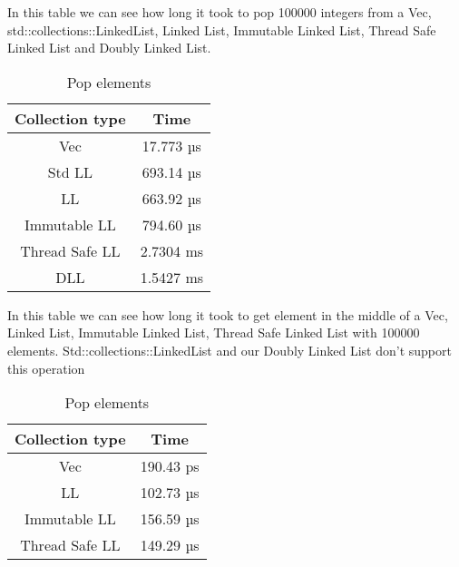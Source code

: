 \documentclass[11pt,twoside,a4paper]{article}
\begin{document}
In this table we can see how long it took to pop 100000 integers from a Vec,\\
std::collections::LinkedList, Linked List, Immutable Linked List, Thread Safe
Linked List and Doubly Linked List.
\begin{table}[!h]
      \begin{center}
            \caption{Pop elements}
            \begin{tabular}{|c|c|}
                  \hline
                  Collection type & Time      \\
                  \hline
                  Vec             & 17.773 µs \\
                  Std LL          & 693.14 µs \\
                  LL              & 663.92 µs \\
                  Immutable LL    & 794.60 µs \\
                  Thread Safe LL  & 2.7304 ms \\
                  DLL             & 1.5427 ms \\
                  \hline
            \end{tabular}
      \end{center}
\end{table}

In this table we can see how long it took to get element in the middle of a Vec,
Linked List, Immutable Linked List, Thread Safe Linked List with 100000 elements.
Std::collections::LinkedList and our Doubly Linked List don't support this operation
\begin{table}[!h]
      \begin{center}
            \caption{Pop elements}
            \begin{tabular}{|c|c|}
                  \hline
                  Collection type & Time      \\
                  \hline
                  Vec             & 190.43 ps \\
                  LL              & 102.73 µs \\
                  Immutable LL    & 156.59 µs \\
                  Thread Safe LL  & 149.29 µs \\
                  \hline
            \end{tabular}
      \end{center}
\end{table}

\pagebreak
\end{document}
